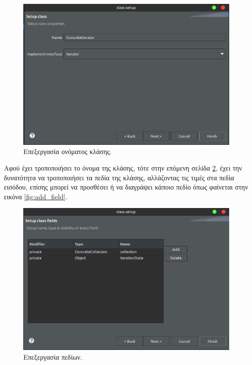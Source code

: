\begin{figure}[H]
    \centering
    \includegraphics[width=1.0\textwidth]{Figures/class_name.png}
    \caption{Επεξεργασία ονόματος κλάσης.}
    \label{fig:class_name}
\end{figure}
Αφού έχει τροποποιήσει το όνομα της κλάσης, τότε στην επόμενη σελίδα \ref{fig:edit_fields}, 
έχει την δυνατότητα να τροποποιήσει τα πεδία της κλάσης, αλλάζοντας τις τιμές στα πεδία εισόδου, 
επίσης μπορεί να προσθέσει ή να διαγράψει κάποιο πεδίο όπως φαίνεται στην εικόνα \ref{fig:add_field}.
\begin{figure}[H]
    \centering
    \includegraphics[width=1.0\textwidth]{Figures/edit_fields.png}
    \caption{Επεξεργασία πεδίων.}
    \label{fig:edit_fields}
\end{figure}
